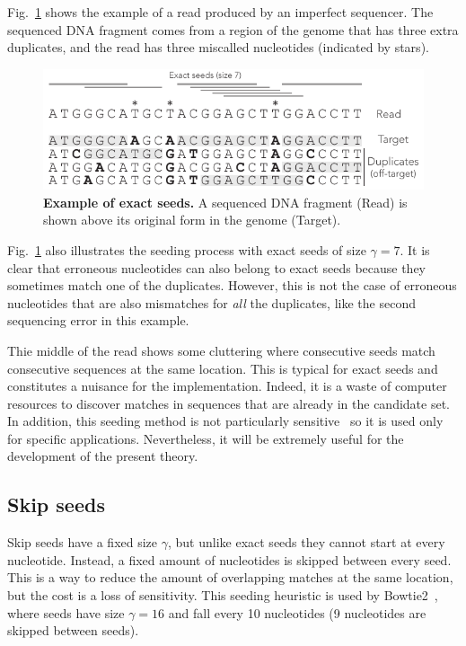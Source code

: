 \documentclass{article}
\begin{document}
Fig.~\ref{fig:exact_seed_example} shows the example of a read produced
by an imperfect sequencer. The sequenced DNA fragment comes from a region
of the genome that has three extra duplicates, and the read has three
miscalled nucleotides (indicated by stars).

\begin{figure}[h]
\centering
\includegraphics[scale=1]{exact_seed_example.pdf}
\caption{\textbf{Example of exact seeds.}
A sequenced DNA fragment (Read) is shown above its original form in the
genome (Target).}
\label{fig:exact_seed_example}
\end{figure}

Fig.~\ref{fig:exact_seed_example} also illustrates the seeding process
with exact seeds of size $\gamma=7$. It is clear that erroneous
nucleotides can also belong to exact seeds because they sometimes match
one of the duplicates. However, this is not the case of erroneous
nucleotides that are also mismatches for \emph{all} the duplicates, like
the second sequencing error in this example.

Thie middle of the read shows some cluttering where consecutive seeds
match consecutive sequences at the same location. This is typical for
exact seeds and constitutes a nuisance for the implementation. Indeed, it
is a waste of computer resources to discover matches in sequences that are
already in the candidate set. In addition, this seeding method is not
particularly sensitive~\cite{pmid11934743} so it is used only for specific
applications. Nevertheless, it will be extremely useful for the
development of the present theory.


\subsection{Skip seeds}

Skip seeds have a fixed size $\gamma$, but unlike exact seeds they cannot
start at every nucleotide. Instead, a fixed amount of nucleotides is
skipped between every seed. This is a way to reduce the amount of
overlapping matches at the same location, but the cost is a loss of
sensitivity. This seeding heuristic is used by
Bowtie2~\cite{pmid22388286}, where seeds have size $\gamma=16$ and fall
every 10 nucleotides (9 nucleotides are skipped between seeds).
\end{document}
